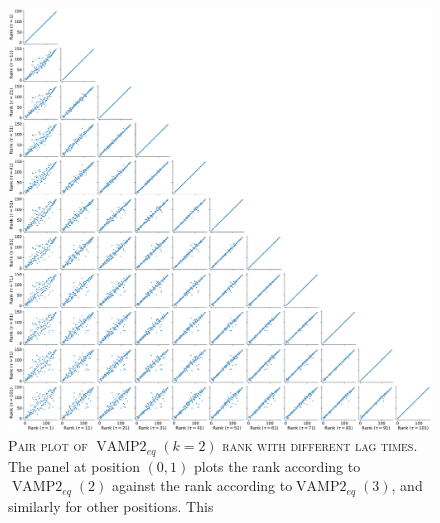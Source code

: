 \documentclass{article}
\begin{document}
\begin{figure}
    \centering
    \includegraphics[width=1.0\textwidth]{SI_figures/1fme_vampeq_rank_vs_lag_pairplot_k2.pdf}
    \caption{\textsc{Pair plot of $\operatorname{VAMP2}_{eq}(k=2)$ rank with different lag times.} The panel at position $(0,1)$ plots the rank according to$\operatorname{VAMP2}_{eq}(2)$ against the  rank according to$\operatorname{VAMP2}_{eq}(3)$, and similarly for other positions. This }
    \label{fig:vampeq2_rank_vs_lag_pairplot}
\end{figure}
\end{document}
